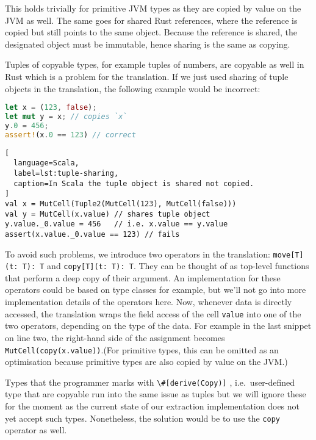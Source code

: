 This holds trivially for primitive JVM types as they are copied by value
on the JVM as well. The same goes for shared Rust references, where the
reference is copied but still points to the same object. Because the
reference is shared, the designated object must be immutable, hence
sharing is the same as copying.

Tuples of copyable types, for example tuples of numbers, are copyable as
well in Rust which is a problem for the translation. If we just used
sharing of tuple objects in the translation, the following example would
be incorrect:

\begin{lstlisting}[language=Rust, caption=The tuple is copied on line 2.]
let x = (123, false);
let mut y = x; // copies `x`
y.0 = 456;
assert!(x.0 == 123) // correct
\end{lstlisting}

\begin{lstlisting}[
  language=Scala,
  label=lst:tuple-sharing,
  caption=In Scala the tuple object is shared not copied.
]
val x = MutCell(Tuple2(MutCell(123), MutCell(false)))
val y = MutCell(x.value) // shares tuple object
y.value._0.value = 456   // i.e. x.value == y.value
assert(x.value._0.value == 123) // fails
\end{lstlisting}

To avoid such problems, we introduce two operators in the translation:
\passthrough{\lstinline!move[T](t: T): T!} and
\passthrough{\lstinline!copy[T](t: T): T!}. They can be thought of as
top-level functions that perform a deep copy of their argument. An
implementation for these operators could be based on type classes for
example, but we'll not go into more implementation details of the
operators here. Now, whenever data is directly accessed, the translation
wraps the field access of the cell \passthrough{\lstinline!value!} into
one of the two operators, depending on the type of the data. For example
in the last snippet on line two, the right-hand side of the assignment
becomes \lstinline!MutCell(copy(x.value))!.(For primitive
types, this can be omitted as an optimisation because primitive types
are also copied by value on the JVM.)

Types that the programmer marks with
\passthrough{\lstinline!\#[derive(Copy)]!} , i.e.~user-defined type that
are copyable run into the same issue as tuples but we will ignore these
for the moment as the current state of our extraction implementation
does not yet accept such types. Nonetheless, the solution would be to
use the \passthrough{\lstinline!copy!} operator as well.


